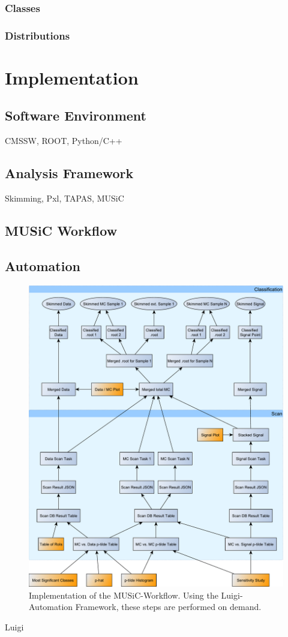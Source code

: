 \subsubsection{Classes}
\subsubsection{Distributions}

\section{Implementation}
\subsection{Software Environment}
CMSSW, ROOT, Python/C++

\subsection{Analysis Framework}
Skimming, Pxl, TAPAS, MUSiC

\subsection{MUSiC Workflow}

\subsection{Automation}
\begin{figure}
    \centering
    \includegraphics[width=\textwidth]{../music-workflow}
    \vspace{0.5em}
    \caption{Implementation of the MUSiC-Workflow. Using the Luigi-Automation Framework, these steps are performed on demand.}
    \label{fig:music_workflow}
\end{figure}

Luigi